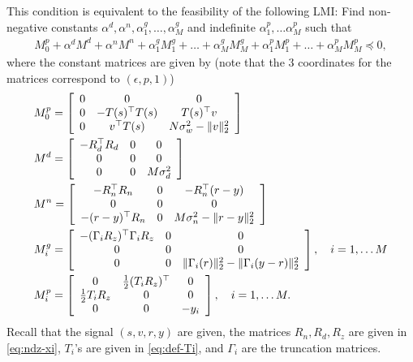 \documentclass[11pt, onecolumn]{article}
\begin{document}
This condition is  equivalent to the  feasibility of the following LMI:
Find non-negative constants $\alpha^d, \alpha^n,\alpha^g_1,\dots, \alpha^g_M$ and indefinite $\alpha^p_1,\dots
\alpha^p_M$ such that
\begin{align*}
  M_0^p +  \alpha^d M^d + \alpha^n M^n  + \alpha^g_1 M^g_1
  + \dots+ \alpha^g_M M^g_M   + \alpha^p_1 M^p_1 +\dots + \alpha^p_M M^p_M \preceq 0,
\end{align*}
where the constant matrices are given by (note that the 3 coordinates for the matrices correspond to $(\epsilon, p, 1)$)
\begin{align*}
  & M^p_0 = \left[ \begin{array}[c]{ccc} 0 &0&0 \\ 0 & -T(s)^\top T(s)& T(s)^\top v \\ 0& v^\top T(s)
    & N\sigma_w^2 - \|v\|_2^2 \end{array} \right]
  \\
  & M^d = \left[ \begin{array}[c]{ccc} -R_d^\top R_d &0 & 0 \\ 0 & 0 & 0 \\ 0&0&
    M\sigma_d^2 \end{array} \right]
  \\
  & M^n = \left[ \begin{array}[c]{ccc} -R_n^\top R_n &0& -R_n^\top(r-y) \\ 0 & 0& 0 \\ -(r-y)^\top
    R_n& 0 & M\sigma_n^2 - \|r-y\|_2^2 \end{array} \right]
  \\
  & M^g_i = \left[ \begin{array}[c]{ccc} - (\Gamma_{i}R_z)^\top \Gamma_{i}R_z &0 & 0 \\ 0 & 0 & 0 \\
    0&0& \|\Gamma_{i}(r)\|_2^2 - \|\Gamma_{i}(y-r)\|_2^2 \end{array} \right], \quad i = 1,\dots M
  \\
  & M^p_i = \left[ \begin{array}[c]{ccc} 0 &{1\over 2}(T_iR_z)^\top & 0 \\ {1\over 2} T_iR_z & 0 & 0
    \\ 0&0& -y_i \end{array} \right], \quad i = 1,\dots M.
\end{align*}
Recall that the signal $(s,v, r, y)$ are given, the matrices $R_n, R_d,R_z$ are given in
\eqref{eq:ndz-xi}, $T_i$'s are given in \eqref{eq:def-Ti}, and $\Gamma_i$ are the truncation
matrices.
\end{document}
